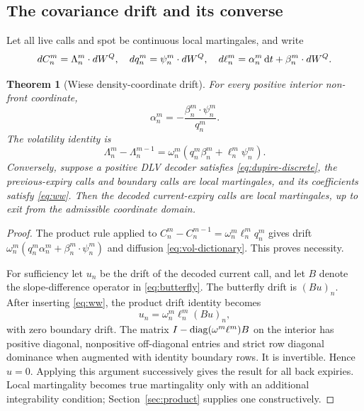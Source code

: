 \documentclass[11pt,a4paper]{article}
\numberwithin{equation}{section}
\newtheorem{theorem}{Theorem}[section]
\theoremstyle{definition}\newtheorem{definition}[theorem]{Definition}
\theoremstyle{remark}\newtheorem{remark}[theorem]{Remark}
\begin{document}
\subsection{The covariance drift and its converse}
Let all live calls and spot be continuous local martingales, and write
\begin{equation}
 dC_n^m=\Lambda_n^m\cdot dW^Q,\quad dq_n^m=\psi_n^m\cdot dW^Q,\quad
 d\ell_n^m=\alpha_n^m\,\mathrm dt+\beta_n^m\cdot dW^Q.
 \label{eq:finite-sdes}
\end{equation}
\begin{theorem}[Wiese density-coordinate drift]
\label{thm:ww}
For every positive interior non-front coordinate,
\begin{equation}
 \boxed{\quad\alpha_n^m=-\frac{\beta_n^m\cdot\psi_n^m}{q_n^m}.\quad}
 \label{eq:ww}
\end{equation}
The volatility identity is
\begin{equation}
 \Lambda_n^m-\Lambda_n^{m-1}
  =\omega_n^m(q_n^m\beta_n^m+\ell_n^m\psi_n^m).
 \label{eq:vol-dictionary}
\end{equation}
Conversely, suppose a positive DLV decoder satisfies \eqref{eq:dupire-discrete}, the previous-expiry calls and boundary calls are local martingales, and its coefficients satisfy \eqref{eq:ww}. Then the decoded current-expiry calls are local martingales, up to exit from the admissible coordinate domain.
\end{theorem}
\begin{proof}
The product rule applied to $C_n^m-C_n^{m-1}=\omega_n^m\ell_n^mq_n^m$ gives drift $\omega_n^m(q_n^m\alpha_n^m+\beta_n^m\cdot\psi_n^m)$ and diffusion \eqref{eq:vol-dictionary}. This proves necessity.

For sufficiency let $u_n$ be the drift of the decoded current call, and let $B$ denote the slope-difference operator in \eqref{eq:butterfly}. The butterfly drift is $(Bu)_n$. After inserting \eqref{eq:ww}, the product drift identity becomes
\[
 u_n=\omega_n^m\ell_n^m(Bu)_n,
\]
with zero boundary drift. The matrix $I-\operatorname{diag}(\omega^m\ell^m)B$ on the interior has positive diagonal, nonpositive off-diagonal entries and strict row diagonal dominance when augmented with identity boundary rows. It is invertible. Hence $u=0$. Applying this argument successively gives the result for all back expiries. Local martingality becomes true martingality only with an additional integrability condition; Section~\ref{sec:product} supplies one constructively.
\end{proof}
\end{document}
